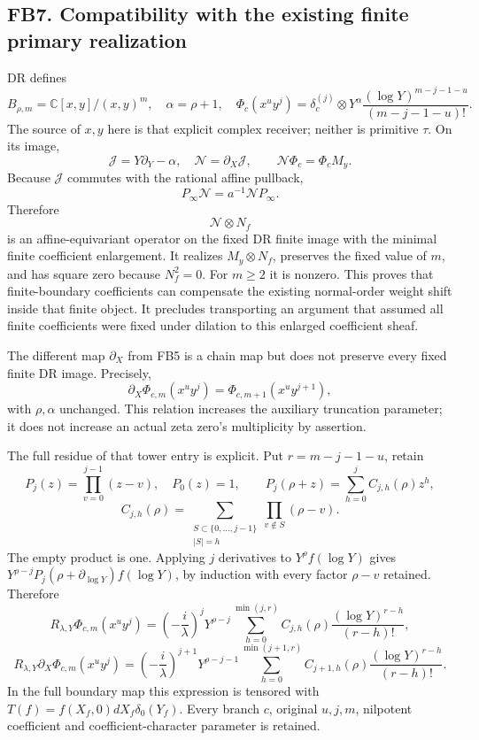 \subsection{FB7. Compatibility with the existing finite primary
realization}\label{fb7.-compatibility-with-the-existing-finite-primary-realization}

DR defines \[
B_{\rho,m}=\mathbb C[x,y]/(x,y)^m,\quad
\alpha=\rho+1,\quad
\Phi_c(x^uy^j)
=\delta_c^{(j)}\otimes
Y^\alpha\frac{(\log Y)^{m-j-1-u}}{(m-j-1-u)!}.
\tag{FB7.1}
\] The source of \(x,y\) here is that explicit complex receiver; neither
is primitive \(\tau\). On its image, \[
\mathscr J=Y\partial_Y-\alpha,\quad
\mathscr N=\partial_X\mathscr J,\qquad
\mathscr N\Phi_c=\Phi_c M_y.
\tag{FB7.2}
\] Because \(\mathscr J\) commutes with the rational affine pullback, \[
P_\infty\mathscr N=a^{-1}\mathscr NP_\infty.
\] Therefore \[
\mathscr N\otimes N_f
\tag{FB7.3}
\] is an affine-equivariant operator on the fixed DR finite image with
the minimal finite coefficient enlargement. It realizes
\(M_y\otimes N_f\), preserves the fixed value of \(m\), and has square
zero because \(N_f^2=0\). For \(m\ge2\) it is nonzero. This proves that
finite-boundary coefficients can compensate the existing normal-order
weight shift inside that finite object. It precludes transporting an
argument that assumed all finite coefficients were fixed under dilation
to this enlarged coefficient sheaf.

The different map \(\partial_X\) from FB5 is a chain map but does not
preserve every fixed finite DR image. Precisely, \[
\partial_X\Phi_{c,m}(x^uy^j)
=\Phi_{c,m+1}(x^uy^{j+1}),
\tag{FB7.4}
\] with \(\rho,\alpha\) unchanged. This relation increases the auxiliary
truncation parameter; it does not increase an actual zeta zero's
multiplicity by assertion.

The full residue of that tower entry is explicit. Put \(r=m-j-1-u\),
retain \[
P_j(z)=\prod_{v=0}^{j-1}(z-v),\quad P_0(z)=1,\qquad
P_j(\rho+z)=\sum_{h=0}^j C_{j,h}(\rho)z^h,
\] \[
C_{j,h}(\rho)=
\sum_{\substack{S\subset\{0,\ldots,j-1\}\\|S|=h}}
\prod_{v\notin S}(\rho-v).
\tag{FB7.4a}
\] The empty product is one. Applying \(j\) derivatives to
\(Y^\rho f(\log Y)\) gives
\(Y^{\rho-j}P_j(\rho+\partial_{\log Y})f(\log Y)\), by induction with
every factor \(\rho-v\) retained. Therefore \[
R_{\lambda,Y}\Phi_{c,m}(x^uy^j)
=\left(-\frac{i}{\lambda}\right)^j
Y^{\rho-j}
\sum_{h=0}^{\min(j,r)}
C_{j,h}(\rho)\frac{(\log Y)^{r-h}}{(r-h)!},
\] \[
\boxed{
R_{\lambda,Y}\partial_X\Phi_{c,m}(x^uy^j)
=\left(-\frac{i}{\lambda}\right)^{j+1}
Y^{\rho-j-1}
\sum_{h=0}^{\min(j+1,r)}
C_{j+1,h}(\rho)\frac{(\log Y)^{r-h}}{(r-h)!}.}
\tag{FB7.4b}
\] In the full boundary map this expression is tensored with
\(T(f)=f(X_f,0)dX_f\delta_0(Y_f)\). Every branch \(c\), original
\(u,j,m\), nilpotent coefficient and coefficient-character parameter is
retained.

